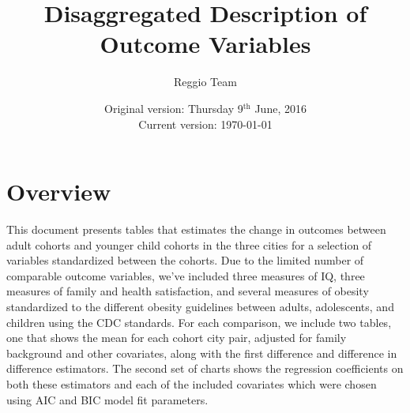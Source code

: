 \documentclass[12pt]{article}
\begin{document}
\title{Disaggregated Description of Outcome Variables}
\author{Reggio Team}
\date{Original version: Thursday 9$^{\text{th}}$ June, 2016 \\ Current version: \today \\ \currenttime}
\maketitle

\listoftables

\section{}

\section*{Overview}

This document presents tables that estimates the change in outcomes between adult cohorts and younger child cohorts in the three cities for a selection of variables standardized between the cohorts.  Due to the limited number of comparable outcome variables, we've included three measures of IQ, three measures of family and health satisfaction, and several measures of obesity standardized to the different obesity guidelines between adults, adolescents, and children using the CDC standards.  For each comparison, we include two tables, one that shows the mean for each cohort city pair, adjusted for family background and other covariates, along with the first difference and difference in difference estimators. The second set of charts shows the regression coefficients on both these estimators and each of the included covariates which were chosen using AIC and BIC model fit parameters.
\end{document}
